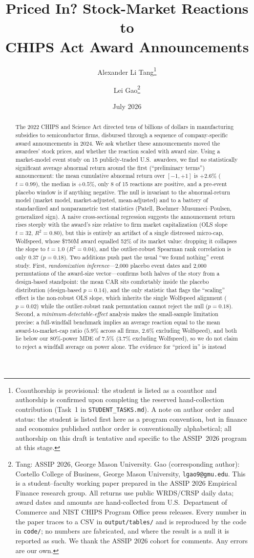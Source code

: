 \documentclass[12pt]{article}
\title{\textbf{Priced In? Stock-Market Reactions to\\
CHIPS Act Award Announcements}}
\author{Alexander Li Tang\thanks{Coauthorship is provisional: the student is listed as a coauthor and authorship is confirmed upon completing the reserved hand-collection contribution (Task~1 in \texttt{STUDENT\_TASKS.md}). A note on author order and status: the student is listed first here as a program convention, but in finance and economics published author order is conventionally alphabetical; all authorship on this draft is tentative and specific to the ASSIP~2026 program at this stage.} \and Lei Gao\thanks{Tang: ASSIP 2026, George Mason University.
Gao (corresponding author): Costello College of Business, George Mason University,
\texttt{lgao9@gmu.edu}. This is a student--faculty working paper prepared in the ASSIP 2026
Empirical Finance research group. All returns use public WRDS/CRSP daily data; award dates and
amounts are hand-collected from U.S.\ Department of Commerce and NIST CHIPS Program Office press
releases. Every number in the paper traces to a CSV in \texttt{output/tables/} and is reproduced
by the code in \texttt{code/}; no numbers are fabricated, and where the result is a null it is
reported as such. We thank the ASSIP 2026 cohort for comments. Any errors are our own.}}
\date{July 2026}
\begin{document}
\maketitle

\begin{abstract}
\noindent The 2022 CHIPS and Science Act directed tens of billions of dollars in
manufacturing subsidies to semiconductor firms, disbursed through a sequence of
company-specific award announcements in 2024. We ask whether these announcements moved the
awardees' stock prices, and whether the reaction scaled with award size. Using a
market-model event study on 15 publicly-traded U.S.\ awardees, we find \emph{no}
statistically significant average abnormal return around the first (``preliminary terms'')
announcement: the mean cumulative abnormal return over $[-1,+1]$ is $+2.6\%$ ($t=0.99$),
the median is $+0.5\%$, only 8 of 15 reactions are positive, and a pre-event placebo window
is if anything negative. The null is invariant to the abnormal-return model (market model,
market-adjusted, mean-adjusted) and to a battery of standardized and nonparametric test
statistics (Patell, Boehmer--Musumeci--Poulsen, generalized sign). A naive cross-sectional
regression suggests the announcement return rises steeply with the award's size relative to
firm market capitalization (OLS slope $t=32$, $R^2=0.80$), but this is entirely an artifact of
a single distressed micro-cap, Wolfspeed, whose \$750M award equalled 52\% of its market value:
dropping it collapses the slope to $t=1.0$ ($R^2=0.04$), and the outlier-robust Spearman rank
correlation is only $0.37$ ($p=0.18$). Two additions push past the usual ``we found nothing''
event study. First, \emph{randomization inference}---2{,}000 placebo event dates and 2{,}000
permutations of the award-size vector---confirms both halves of the story from a design-based
standpoint: the mean CAR sits comfortably inside the placebo distribution (design-based
$p=0.14$), and the only statistic that flags the ``scaling'' effect is the non-robust OLS slope,
which inherits the single Wolfspeed alignment ($p=0.02$) while the outlier-robust rank
permutation cannot reject the null ($p=0.18$). Second, a \emph{minimum-detectable-effect}
analysis makes the small-sample limitation precise: a full-windfall benchmark implies an average
reaction equal to the mean award-to-market-cap ratio ($5.9\%$ across all firms, $2.6\%$ excluding
Wolfspeed), and both lie below our 80\%-power MDE of $7.5\%$ ($3.7\%$ excluding Wolfspeed), so we
do not claim to reject a windfall average on power alone. The evidence for ``priced in'' is instead

\end{abstract}
\end{document}
